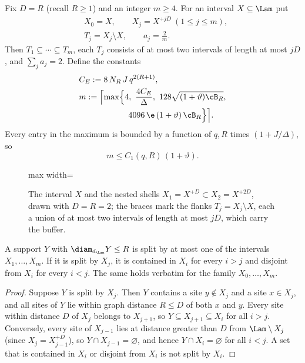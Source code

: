 \precisely
Fix $D=R$ (recall $R\ge1$) and an integer $m\ge4$. For an interval $X\subseteq\Lam$
put
\[
\begin{split}
 &X_0=X,\qquad X_j=X^{+jD}\ (1\le j\le m),\\
 &T_j=X_j\setminus X,
 \qquad a_j=\frac2m .
\end{split}
\]
Then $T_1\subseteq\cdots\subseteq T_m$, each $T_j$ consists of at most two
intervals of length at most $jD$, and $\sum_ja_j=2$. Define the constants
\begin{equation}\label{eq:CE}
\begin{split}
 &C_E:=8\,N_R\,J\,q^{2(R+1)},\\
 &m:=\Bigl\lceil\max\Bigl\{4,\ \frac{4C_E}{\Delta},\ 128\sqrt{(1+\vartheta)\cB_R},\\
 &\qquad\qquad\qquad
 4096\,\e\,(1+\vartheta)\,\cB_R\Bigr\}\Bigr\rceil .
\end{split}
\end{equation}
Every entry in the maximum is bounded by a function of $q,R$ times
$(1+J/\Delta)$, so
\begin{equation}\label{eq:mbound}
 m\le C_1(q,R)\,(1+\vartheta).
\end{equation}

\begin{figure}[t]
\centering
\begin{adjustbox}{max width=\linewidth}

\end{adjustbox}
\caption{The interval $X$ and the nested shells $X_1=X^{+D}\subset X_2=X^{+2D}$, drawn with $D=R=2$; the braces mark the flanks $T_j=X_j\setminus X$, each a union of at most two intervals of length at most $jD$, which carry the buffer.}\label{fig:chain-shells}
\end{figure}

\begin{lemma}\label{lem:singlesplit}
A support $Y$ with $\diam_{d_\Lam}Y\le R$ is split by at most one of the
intervals $X_1,\dots,X_m$. If it is split by $X_j$, it is contained in
$X_i$ for every $i>j$ and disjoint from $X_i$ for every $i<j$. The same
holds verbatim for the family $X_0,\dots,X_m$.
\end{lemma}
\begin{proof}
Suppose $Y$ is split by $X_j$. Then $Y$ contains a site $y\notin X_j$ and
a site $x\in X_j$, and all sites of $Y$ lie within graph distance $R\le D$
of both $x$ and $y$. Every site within distance $D$ of $X_j$ belongs to
$X_{j+1}$, so $Y\subseteq X_{j+1}\subseteq X_i$ for all $i>j$. Conversely,
every site of $X_{j-1}$ lies at distance greater than $D$ from $\Lam\setminus X_j$
(since $X_j=X_{j-1}^{+D}$), so $Y\cap X_{j-1}=\varnothing$, and hence
$Y\cap X_i=\varnothing$ for all $i<j$. A set that is contained in $X_i$ or
disjoint from $X_i$ is not split by $X_i$.
\end{proof}

